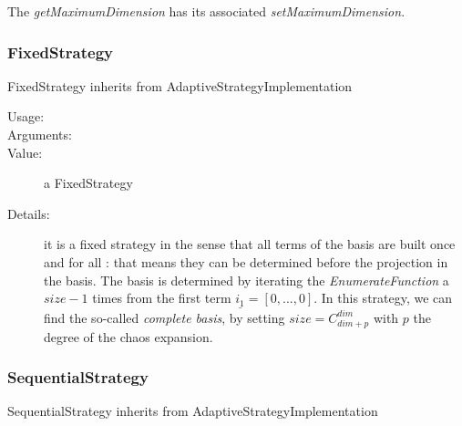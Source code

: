 The \textit{getMaximumDimension} has its associated \textit{setMaximumDimension}.

\newpage
\subsubsection{FixedStrategy}
FixedStrategy inherits from AdaptiveStrategyImplementation
\begin{description}
\item[Usage:] \rule{0pt}{1em}

\item[Arguments:]  \rule{0pt}{1em}

\item[Value:] a FixedStrategy

\item[Details:] it is a fixed strategy in the sense that all terms of the basis are built once and for all :  that means they can be determined before the projection in the basis. The basis is determined by iterating the \textit{EnumerateFunction} a $size -1$ times from the first term $\underline{i_1}=[0,...,0]$. In this strategy, we can find the so-called \emph{complete basis}, by setting $size = C_{dim+p}^{dim}$ with $p$ the degree of the chaos expansion.
\end{description}






\newpage
\subsubsection{SequentialStrategy}
SequentialStrategy inherits from AdaptiveStrategyImplementation

